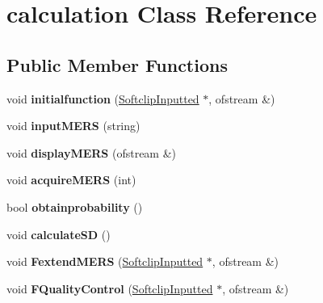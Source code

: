 \hypertarget{classcalculation}{\section{calculation Class Reference}
\label{classcalculation}
}
\subsection*{Public Member Functions}
\begin{DoxyCompactItemize}
\item 
\hypertarget{classcalculation_a8ee6badbe5fbb1d8e9500c5840e9883e}{void {\bfseries initialfunction} (\hyperlink{struct_softclip_inputted}{Softclip\+Inputted} $\ast$, ofstream \&)}\label{classcalculation_a8ee6badbe5fbb1d8e9500c5840e9883e}

\item 
\hypertarget{classcalculation_a47f938df48d9b2a1105e48bfc7c97ad6}{void {\bfseries input\+M\+E\+R\+S} (string)}\label{classcalculation_a47f938df48d9b2a1105e48bfc7c97ad6}

\item 
\hypertarget{classcalculation_a10b3254a42402f7f991cde2559fa08ef}{void {\bfseries display\+M\+E\+R\+S} (ofstream \&)}\label{classcalculation_a10b3254a42402f7f991cde2559fa08ef}

\item 
\hypertarget{classcalculation_a3fbf213edb4c7df0b5e248d7a572590f}{void {\bfseries acquire\+M\+E\+R\+S} (int)}\label{classcalculation_a3fbf213edb4c7df0b5e248d7a572590f}

\item 
\hypertarget{classcalculation_a2e72f8f57a0c662df7ef25b50708452c}{bool {\bfseries obtainprobability} ()}\label{classcalculation_a2e72f8f57a0c662df7ef25b50708452c}

\item 
\hypertarget{classcalculation_a74dbfe34df278056106008f243879c48}{void {\bfseries calculate\+S\+D} ()}\label{classcalculation_a74dbfe34df278056106008f243879c48}

\item 
\hypertarget{classcalculation_a30289a101f93f03f1110106626459ee1}{void {\bfseries Fextend\+M\+E\+R\+S} (\hyperlink{struct_softclip_inputted}{Softclip\+Inputted} $\ast$, ofstream \&)}\label{classcalculation_a30289a101f93f03f1110106626459ee1}

\item 
\hypertarget{classcalculation_a23fd98dc09b4ade601c1209a1cb30a78}{void {\bfseries F\+Quality\+Control} (\hyperlink{struct_softclip_inputted}{Softclip\+Inputted} $\ast$, ofstream \&)}\label{classcalculation_a23fd98dc09b4ade601c1209a1cb30a78}


\end{DoxyCompactItemize}
